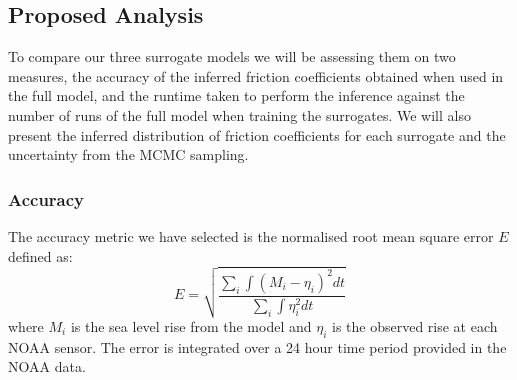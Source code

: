 \documentclass[12pt,a4paper]{article}
\begin{document}
\subsection{Proposed Analysis}
\noindent
To compare our three surrogate models we will be assessing them on two measures, the accuracy of the inferred friction coefficients obtained when used in the full model, and the runtime taken to perform the inference against the number of runs of the full model when training the surrogates. We will also present the inferred distribution of friction coefficients for each surrogate and the uncertainty from the MCMC sampling.
\subsubsection{Accuracy}
\noindent
The accuracy metric we have selected is the normalised root mean square error $E$ defined as:
\begin{equation}
	E=\sqrt{\frac{\sum_{i}\int(M_i-\eta_i)^2dt}{\sum_{i}\int\eta^2_idt}}
\end{equation}
where $M_i$ is the sea level rise from the model and $\eta_i$ is the observed rise at each NOAA sensor. The error is integrated over a 24 hour time period provided in the NOAA data.

\end{document}
